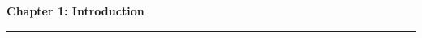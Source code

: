 \setcounter{chapter}{1}
\setcounter{section}{0}

\noindent
{\Large\textbf{Chapter 1: Introduction}}
\vspace{0.3cm}
\hrule
\vspace{0.8cm}
\label{ch:introduction}

\setlength{\parindent}{0pt}


